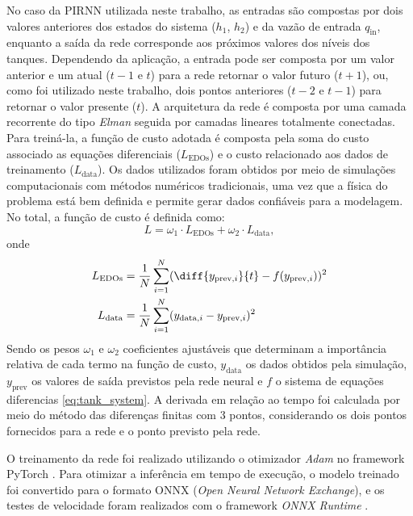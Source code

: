 No caso da PIRNN utilizada neste trabalho, as entradas são compostas por dois valores anteriores dos estados do sistema ($h_1$, $h_2$) e da vazão de entrada $q_{\mathrm{in}}$, enquanto a saída da rede corresponde aos próximos valores dos níveis dos tanques. Dependendo da aplicação, a entrada pode ser composta por um valor anterior e um atual ($t{-}1$ e $t$) para a rede retornar o valor futuro ($t{+}1$), ou, como foi utilizado neste trabalho, dois pontos anteriores ($t{-}2$ e $t{-}1$) para retornar o valor presente ($t$). A arquitetura da rede é composta por uma camada recorrente do tipo \textit{Elman} \citep{elman_1990} seguida por camadas lineares totalmente conectadas. Para treiná-la, a função de custo adotada é composta pela soma do custo associado as equações diferenciais ($L_{\mathrm{EDOs}}$) e o custo relacionado aos dados de treinamento ($L_{\mathrm{data}}$). Os dados utilizados foram obtidos por meio de simulações computacionais com métodos numéricos tradicionais, uma vez que a física do problema está bem definida e permite gerar dados confiáveis para a modelagem. No total, a função de custo é definida como:
\begin{equation}
  L = \omega_1 \cdot L_{\mathrm{EDOs}} + \omega_2 \cdot L_{\mathrm{data}},
\end{equation}
onde
\begin{equation}
  \begin{aligned}
    L_{\mathrm{EDOs}} & = \frac{1}{N} \sum_{i=1}^{N} ( \diff{y_{\mathrm{prev},i}}{t} - f(y_{\mathrm{prev},i}))^2 \\
    L_{\mathrm{data}} & = \frac{1}{N} \sum_{i=1}^{N} (y_{\mathrm{data},i} - y_{\mathrm{prev},i})^2
  \end{aligned}
\end{equation}
Sendo os pesos $\omega_1$ e $\omega_2$ coeficientes ajustáveis que determinam a importância relativa de cada termo na função de custo, $y_{\mathrm{data}}$ os dados obtidos pela simulação, $y_{\mathrm{prev}}$ os valores de saída previstos pela rede neural e $f$ o sistema de equações diferencias \ref{eq:tank_system}. A derivada em relação ao tempo foi calculada por meio do método das diferenças finitas com 3 pontos, considerando os dois pontos fornecidos para a rede e o ponto previsto pela rede.

O treinamento da rede foi realizado utilizando o otimizador \textit{Adam} no framework PyTorch \citep{kingma_2017, pytorch_2024}. Para otimizar a inferência em tempo de execução, o modelo treinado foi convertido para o formato ONNX (\textit{Open Neural Network Exchange}), e os testes de velocidade foram realizados com o framework \textit{ONNX Runtime} \citep{onnxruntime}.

